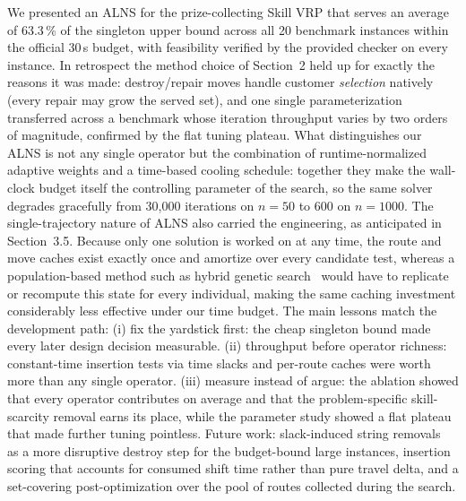 \documentclass[10pt, a4paper]{article}
\begin{document}
We presented an ALNS for the prize-collecting Skill VRP that serves an
average of 63.3\,\% of the singleton upper bound across all 20 benchmark
instances within the official 30\,s budget, with feasibility verified by the
provided checker on every instance. In retrospect the method choice of
Section~2 held up for exactly the reasons it was made: destroy/repair moves
handle customer \emph{selection} natively (every repair may grow the
served set), and one single parameterization transferred across a benchmark
whose iteration throughput varies by two orders of magnitude, confirmed by
the flat tuning plateau. What distinguishes our ALNS is not any single
operator but the combination of runtime-normalized adaptive weights and a
time-based cooling schedule: together they make the wall-clock budget
itself the controlling parameter of the search, so the same solver degrades
gracefully from 30{,}000 iterations on $n=50$ to 600 on $n=1000$. The
single-trajectory nature of ALNS also carried the engineering, as
anticipated in Section~3.5. Because only one solution is worked on at any
time, the route and move caches exist exactly once and amortize over every
candidate test, whereas a population-based method such as hybrid genetic
search~\cite{vidal2022} would have to replicate or recompute this state
for every individual, making the same caching investment considerably less
effective under our time budget.
The main lessons match the development path: (i) fix the yardstick first: the cheap singleton bound made every
later design decision measurable. (ii) throughput before operator
richness: constant-time insertion tests via time slacks and per-route caches
were worth more than any single operator. (iii) measure instead of
argue: the ablation showed that every operator contributes on average and
that the problem-specific skill-scarcity removal earns its place, while the
parameter study showed a flat plateau that made further tuning pointless.
Future work: slack-induced string removals~\cite{christiaens2020} as a more
disruptive destroy step for the budget-bound large instances, insertion
scoring that accounts for consumed shift time rather than pure travel delta,
and a set-covering post-optimization over the pool of routes collected during
the search.
\end{document}

